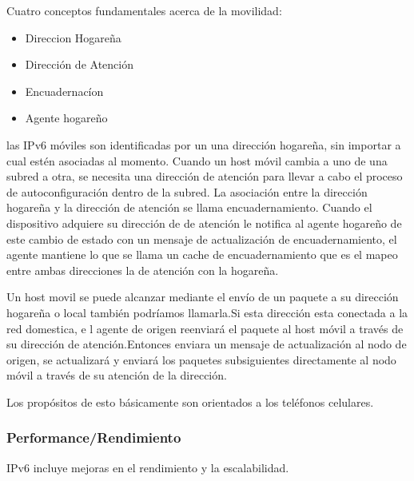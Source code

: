 \documentclass[11pt,a4paper]{article}
\begin{document}
Cuatro conceptos fundamentales acerca de la movilidad:
\begin{itemize}
\item Direccion Hogareña
\item Dirección de Atención
\item Encuadernacíon
\item Agente hogareño

\end {itemize}
las IPv6 móviles son identificadas por un una dirección hogareña, sin importar a cual estén 
asociadas al momento. Cuando un host móvil cambia a uno de una subred a otra, se necesita una 
dirección de atención para llevar a cabo el proceso de autoconfiguración dentro de la subred. La 
asociación entre la dirección hogareña y la dirección de atención se llama encuadernamiento. Cuando 
el dispositivo adquiere su dirección de de atención le notifica al agente hogareño de este cambio de 
estado con un mensaje de  actualización de encuadernamiento, el agente mantiene lo que se llama un 
cache de encuadernamiento que es el mapeo entre ambas direcciones la de atención con la hogareña.
\par Un host movil se puede alcanzar mediante el envío de un paquete a su dirección hogareña o local 
también podríamos llamarla.Si esta dirección esta conectada a la red domestica, e l agente de origen 
reenviará el paquete al host móvil a través de su dirección de atención.Entonces enviara un mensaje 
de actualización al nodo de origen, se actualizará y enviará los paquetes subsiguientes directamente 
al nodo móvil a través de su atención  de la dirección. \par 
Los propósitos de esto básicamente son orientados a los teléfonos celulares.
\subsubsection{Performance/Rendimiento}
IPv6 incluye mejoras en el rendimiento y la escalabilidad.
\end{document}
